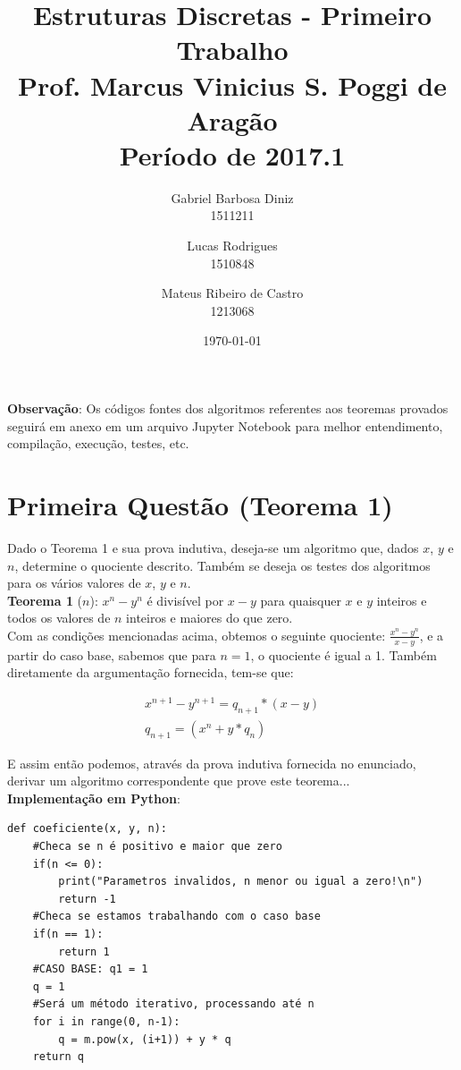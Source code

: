 \documentclass{article}
\title{%
  Estruturas Discretas - Primeiro Trabalho\\
  \large Prof. Marcus Vinicius S. Poggi de Aragão\\
  Período de 2017.1}
\author{Gabriel Barbosa Diniz\\1511211 \and Lucas Rodrigues\\1510848 \and Mateus Ribeiro de Castro\\1213068}
\date{\today}
\begin{document}
\maketitle

\textbf{Observação}: Os códigos fontes dos algoritmos referentes aos teoremas provados seguirá em anexo em um arquivo Jupyter Notebook para melhor entendimento, compilação, execução, testes, etc.

\section{Primeira Questão (Teorema 1)}

Dado o Teorema 1 e sua prova indutiva, deseja-se um algoritmo que, dados $x$, $y$ e $n$, determine o quociente descrito. Também se deseja os testes dos algoritmos para os vários valores de $x$, $y$ e $n$.\\

\textbf{Teorema 1} ($n$): $x^n - y^n$ é divisível por $x-y$ para quaisquer $x$ e $y$ inteiros e todos os valores de $n$ inteiros e maiores do que zero.\\

Com as condições mencionadas acima, obtemos o seguinte quociente: $\frac{x^n - y^n}{x-y}$, e a partir do caso base, sabemos que para $n = 1$, o quociente é igual a 1. Também diretamente da argumentação fornecida, tem-se que:

\begin{gather}
x^{n+1} - y^{n+1} = q_{n+1} * (x - y) \\
q_{n+1} = (x^n + y * q_n)
\end{gather}

E assim então podemos, através da prova indutiva fornecida no enunciado, derivar um algoritmo correspondente que prove este teorema...\\

\textbf{Implementação em Python}:

{\color{blue}
\begin{verbatim}
def coeficiente(x, y, n):
    #Checa se n é positivo e maior que zero
    if(n <= 0):
        print("Parametros invalidos, n menor ou igual a zero!\n")
        return -1
    #Checa se estamos trabalhando com o caso base
    if(n == 1):
        return 1
    #CASO BASE: q1 = 1
    q = 1
    #Será um método iterativo, processando até n
    for i in range(0, n-1):
        q = m.pow(x, (i+1)) + y * q
    return q
\end{verbatim}
}
\end{document}
